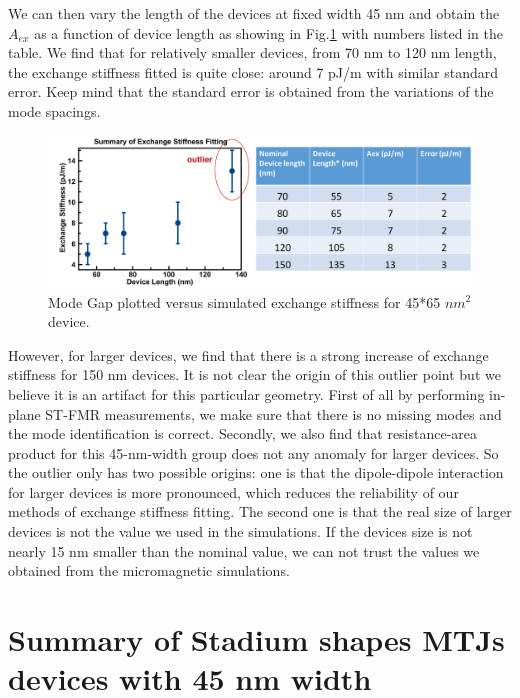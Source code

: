 We can then vary the length of the devices at fixed width 45 nm and obtain the $A_{ex}$ as a function of device length as showing in Fig.\ref{fig:4565ex} with numbers listed in the table. We find that for relatively smaller devices, from 70 nm to 120 nm length, the exchange stiffness fitted is quite close: around 7 pJ/m with similar standard error. Keep mind that the standard error is obtained from the variations of the mode spacings.

\begin{figure}[!ht]
  \centering
  \includegraphics[width=1.0\textwidth]{fig/stadium/60nmexsummary}
   \caption{Mode Gap plotted versus simulated exchange stiffness for 45*65 $nm^2$ device.}
  \label{fig:4565ex}
\end{figure}

However, for larger devices, we find that there is a strong increase of exchange stiffness for 150 nm devices. It is not clear the origin of this outlier point but we believe it is an artifact for this particular geometry. First of all by performing in-plane ST-FMR measurements, we make sure that there is no missing modes and the mode identification is correct. Secondly, we also find that resistance-area product for this 45-nm-width group does not any anomaly for larger devices. So the outlier only has two possible origins: one is that the dipole-dipole interaction for larger devices is more pronounced, which reduces the reliability of our methods of exchange stiffness fitting. The second one is that the real size of larger devices is not the value we used in the simulations. If the devices size is not nearly 15 nm smaller than the nominal value, we can not trust the values we obtained from the micromagnetic simulations.

\clearpage


\section{Summary of Stadium shapes MTJs devices with 45 nm width}

